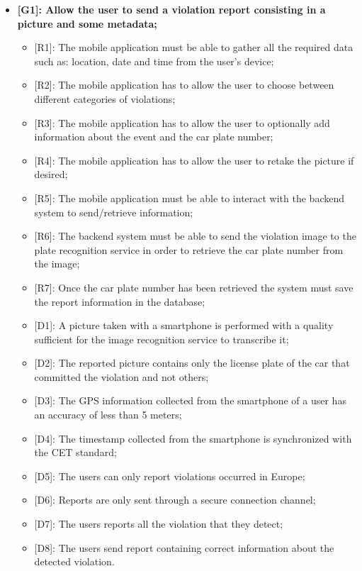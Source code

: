 \begin{itemize}
  \item \textbf{{[G1]}: Allow the user to send a violation report consisting in a picture and some metadata;}
    \begin{itemize}
      \item {[R1]}: The mobile application must be able to gather all the required data such as: location, date and time from the user's device;
      \item {[R2]}: The mobile application has to allow the user to choose between different categories of violations;
      \item {[R3]}: The mobile application has to allow the user to optionally add information about the event and the car plate number;
      \item {[R4]}: The mobile application has to allow the user to retake the picture if desired;
      \item {[R5]}: The mobile application must be able to interact with the backend system to send/retrieve information;
      \item {[R6]}: The backend system must be able to send the violation image to the plate recognition service in order to retrieve the car plate number from the image;
      \item {[R7]}: Once the car plate number has been retrieved the system must save the report information in the database;
      \item {[D1]}: A picture taken with a smartphone is performed with a quality sufficient for the image recognition service to transcribe it;
      \item {[D2]}: The reported picture contains only the license plate of the car that committed the violation and not others;
      \item {[D3]}: The GPS information collected from the smartphone of a user has an accuracy of less than 5 meters;
      \item {[D4]}: The timestamp collected from the smartphone is synchronized with the CET standard;
      \item {[D5]}: The users can only report violations occurred in Europe;
      \item {[D6]}: Reports are only sent through a secure connection channel;
      \item {[D7]}: The users reports all the violation that they detect;
      \item {[D8]}: The users send report containing correct information about the detected violation.

\end{itemize}
\end{itemize}
